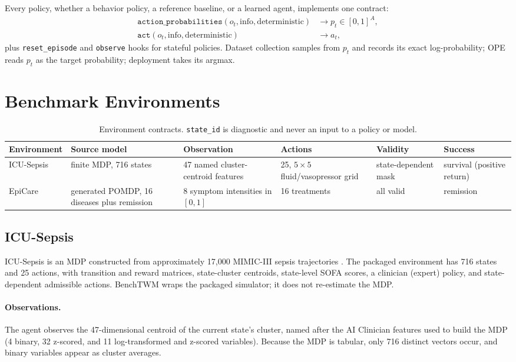 \documentclass[10pt,twocolumn]{article}
\newcommand{\code}[1]{\texttt{#1}}
\begin{document}
Every policy, whether a behavior policy, a reference baseline, or a learned agent, implements one contract:
\begin{align}
    \code{action\_probabilities}(o_t,\mathrm{info},\mathrm{deterministic}) &\rightarrow p_t\in[0,1]^{A},\\
    \code{act}(o_t,\mathrm{info},\mathrm{deterministic}) &\rightarrow a_t,
\end{align}
plus \code{reset\_episode} and \code{observe} hooks for stateful policies. Dataset collection samples from $p_t$ and records its exact log-probability; OPE reads $p_t$ as the target probability; deployment takes its argmax.

\section{Benchmark Environments}
\label{sec:environments}

\begin{table}[t]
\centering
\caption{Environment contracts. \code{state\_id} is diagnostic and never an input to a policy or model.}
\label{tab:environments}
\small
\begin{tabularx}{\textwidth}{lXXXXX}
\toprule
Environment & Source model & Observation & Actions & Validity & Success \\
\midrule
ICU-Sepsis & finite MDP, 716 states & 47 named cluster-centroid features & 25, $5\times5$ fluid/vasopressor grid & state-dependent mask & survival (positive return) \\
EpiCare & generated POMDP, 16 diseases plus remission & 8 symptom intensities in $[0,1]$ & 16 treatments & all valid & remission \\
\bottomrule
\end{tabularx}
\end{table}

\subsection{ICU-Sepsis}
\label{sec:icu}

ICU-Sepsis is an MDP constructed from approximately 17{,}000 MIMIC-III sepsis trajectories \cite{choudhary2024icu}. The packaged environment has 716 states and 25 actions, with transition and reward matrices, state-cluster centroids, state-level SOFA scores, a clinician (expert) policy, and state-dependent admissible actions. BenchTWM wraps the packaged simulator; it does not re-estimate the MDP.

\paragraph{Observations.} The agent observes the 47-dimensional centroid of the current state's cluster, named after the AI Clinician features used to build the MDP (4 binary, 32 z-scored, and 11 log-transformed and z-scored variables). Because the MDP is tabular, only 716 distinct vectors occur, and binary variables appear as cluster averages.
\end{document}
